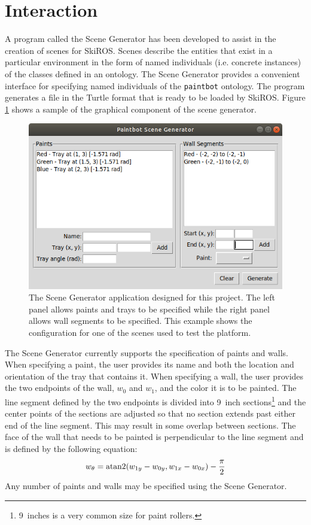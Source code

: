 \section{Interaction} \label{sec:interaction}
A program called the Scene Generator has been developed to assist in the creation of scenes for SkiROS. Scenes describe the entities that exist in a particular environment in the form of named individuals (i.e. concrete instances) of the classes defined in an ontology. The Scene Generator provides a convenient interface for specifying named individuals of the {\tt paintbot} ontology. The program generates a file in the Turtle format that is ready to be loaded by SkiROS. Figure \ref{fig:scene_generator} shows a sample of the graphical component of the scene generator.

\begin{figure}
    \centering
    \includegraphics[width=0.75\linewidth]{images/scene_generator.png}
    \caption{The Scene Generator application designed for this project. The left panel allows paints and trays to be specified while the right panel allows wall segments to be specified. This example shows the configuration for one of the scenes used to test the platform.}
    \label{fig:scene_generator}
\end{figure}

The Scene Generator currently supports the specification of paints and walls. When specifying a paint, the user provides its name and both the location and orientation of the tray that contains it. When specifying a wall, the user provides the two endpoints of the wall, $w_0$ and $w_1$, and the color it is to be painted. The line segment defined by the two endpoints is divided into \SI{9}{inch} sections\footnote{\SI{9}{inches} is a very common size for paint rollers.} and the center points of the sections are adjusted so that no section extends past either end of the line segment. This may result in some overlap between sections. The face of the wall that needs to be painted is perpendicular to the line segment and is defined by the following equation:
\[w_\theta = \operatorname{atan2}(w_{1y} - w_{0y}, w_{1x} - w_{0x}) - \frac{\pi}{2}\]
Any number of paints and walls may be specified using the Scene Generator.

